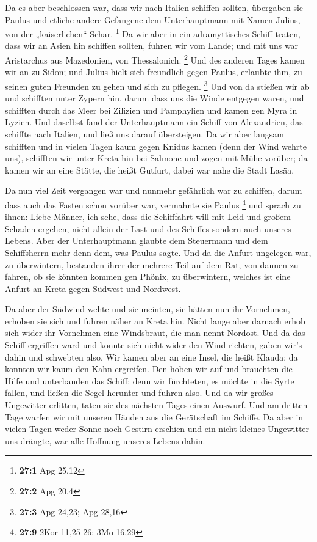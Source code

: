  Da es aber beschlossen war, dass wir nach Italien
schiffen sollten, übergaben sie Paulus und etliche andere Gefangene dem
Unterhauptmann mit Namen Julius, von der „kaiserlichen`` Schar.
\footnote{\textbf{27:1} Apg 25,12}  Da wir aber in ein
adramyttisches Schiff traten, dass wir an Asien hin schiffen sollten,
fuhren wir vom Lande; und mit uns war Aristarchus aus Mazedonien, von
Thessalonich. \footnote{\textbf{27:2} Apg 20,4}  Und des
anderen Tages kamen wir an zu Sidon; und Julius hielt sich freundlich
gegen Paulus, erlaubte ihm, zu seinen guten Freunden zu gehen und sich
zu pflegen. \footnote{\textbf{27:3} Apg 24,23; Apg 28,16} 
Und von da stießen wir ab und schifften unter Zypern hin, darum dass uns
die Winde entgegen waren,  und schifften durch das Meer
bei Zilizien und Pamphylien und kamen gen Myra in Lyzien. 
Und daselbst fand der Unterhauptmann ein Schiff von Alexandrien, das
schiffte nach Italien, und ließ uns darauf übersteigen. 
Da wir aber langsam schifften und in vielen Tagen kaum gegen Knidus
kamen (denn der Wind wehrte uns), schifften wir unter Kreta hin bei
Salmone  und zogen mit Mühe vorüber; da kamen wir an eine
Stätte, die heißt Gutfurt, dabei war nahe die Stadt Lasäa.

 Da nun viel Zeit vergangen war und nunmehr gefährlich war
zu schiffen, darum dass auch das Fasten schon vorüber war, vermahnte sie
Paulus \footnote{\textbf{27:9} 2Kor 11,25-26; 3Mo 16,29} 
und sprach zu ihnen: Liebe Männer, ich sehe, dass die Schifffahrt will
mit Leid und großem Schaden ergehen, nicht allein der Last und des
Schiffes sondern auch unseres Lebens.  Aber der
Unterhauptmann glaubte dem Steuermann und dem Schiffsherrn mehr denn
dem, was Paulus sagte.  Und da die Anfurt ungelegen war,
zu überwintern, bestanden ihrer der mehrere Teil auf dem Rat, von dannen
zu fahren, ob sie könnten kommen gen Phönix, zu überwintern, welches ist
eine Anfurt an Kreta gegen Südwest und Nordwest.

 Da aber der Südwind wehte und sie meinten, sie hätten
nun ihr Vornehmen, erhoben sie sich und fuhren näher an Kreta hin.
 Nicht lange aber darnach erhob sich wider ihr Vornehmen
eine Windsbraut, die man nennt Nordost.  Und da das
Schiff ergriffen ward und konnte sich nicht wider den Wind richten,
gaben wir's dahin und schwebten also.  Wir kamen aber an
eine Insel, die heißt Klauda; da konnten wir kaum den Kahn ergreifen.
 Den hoben wir auf und brauchten die Hilfe und
unterbanden das Schiff; denn wir fürchteten, es möchte in die Syrte
fallen, und ließen die Segel herunter und fuhren also. 
Und da wir großes Ungewitter erlitten, taten sie des nächsten Tages
einen Auswurf.  Und am dritten Tage warfen wir mit
unseren Händen aus die Gerätschaft im Schiffe.  Da aber
in vielen Tagen weder Sonne noch Gestirn erschien und ein nicht kleines
Ungewitter uns drängte, war alle Hoffnung unseres Lebens dahin.

